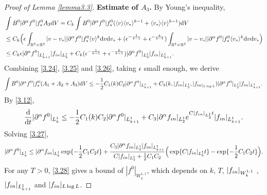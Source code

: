\documentclass[10pt,a4paper]{amsart}
\def\pa{\partial}
\let\al=\alpha
\newcommand{\ben}{\begin{eqnarray}}
\newcommand{\beq}{\begin{equation}}
\newcommand{\een}{\end{eqnarray}}
\newcommand{\eeq}{\end{equation}}
\begin{document}
\begin{proof}[Proof of Lemma \ref{lemma3.3}]
 \textbf{Estimate of $A_3$.} By Young's inequality,
\beq\label{3.26}
\begin{aligned}
   & \int B^0|\pa^{\al}f^0|f^0_* A_3\mathrm{d}V=C_k\int B^0|\pa^{\al}f^0|f^0_*(\langle v\rangle\langle v_*\rangle^{k-1}+\langle v_*\rangle\langle v\rangle^{k-1})\mathrm{d}V\\
    &\le C_k\Big(\epsilon\int_{\mathbb{R}^3\times\mathbb{R}^3} |v-v_*||\pa^{\al}f^0|f^0_*\langle v\rangle^{k}\mathrm{d}v\mathrm{d}v_*+(\epsilon^{-\frac{1}{k-1}}+\epsilon^{-\frac{k}{k-1}})\int_{\mathbb{R}^3\times\mathbb{R}^3} |v-v_*||\pa^{\al}f^0|f^0_*\langle v_*\rangle^{k}\mathrm{d}v\mathrm{d}v_*\Big)\\
    &\le C_k\epsilon |\pa^{\al}f^0|_{L^1_{k+1}}|f_{\textup{in}}|_{L^1_2}+C_k(\epsilon^{-\frac{1}{k-1}}+\epsilon^{-\frac{k}{k-1}})|\pa^{\al}f^0|_{L^1_2}|f_{\textup{in}}|_{L^1_{k+1}}.
\end{aligned}
\eeq
Combining \eqref{3.24}, \eqref{3.25} and \eqref{3.26}, taking $\epsilon$ small enough, we derive
$$
\int B^0|\pa^{\al}f^0|f^0_*(A_1+A_2+A_3)\mathrm{d}V\le -\frac{1}{2}C_1(k)C_2|\pa^{\al}f^0|_{L^1_{k+1}}+C_3(k,|f_{\textup{in}}|_{L^1_2},|f_{\textup{in}|_{L\log L}})|\pa^{\al}f^0|_{L^1_2}|f_{\textup{in}}|_{L^1_{k+1}}.
$$
By \eqref{3.12},
\ben\label{3.27}
\frac{\mathrm{d}}{\mathrm{d}t}|\pa^{\al}f^0|_{L^1_{k}}\le -\frac{1}{2}C_1(k)C_2|\pa^{\al}f^0|_{L^1_{k+1}}+C_3|\pa^{\al}f_{\textup{in}}|_{L^1_2}e^{C|f_{\textup{in}}|_{L^1_3}t}|f_{\textup{in}}|_{L^1_{k+1}}.
\een
Solving \eqref{3.27},
\ben\label{3.28}
|\pa^{\al}f^0|_{L^1_{k}}\le |\pa^{\al}f_{\textup{in}}|_{L^1_{k}}\exp\{-\frac{1}{2}C_1C_2t\}+\frac{C_3|\pa^{\al}f_{\textup{in}}|_{L^1_{2}}|f_{\textup{in}}|_{L^1_{k+1}}}{C|f_{\textup{in}}|_{L^1_3}+\frac{1}{2}C_1C_2}\Big(\exp\{C|f_{\textup{in}}|_{L^1_3}t\}-\exp\{-\frac{1}{2}C_1C_2t\}\Big).
\een
For any $T>0$, \eqref{3.28} gives a bound of $|f^0|_{W^{1,1}_{k}}$, which depends on $k$, $T$, $|f_{\textup{in}}|_{W^{1,1}_{k}}$ , $|f_{\textup{in}}|_{L^1_{k+1}}$ and $|f_{\textup{in}}|_{L\log L}$.
\end{proof}
\end{document}
